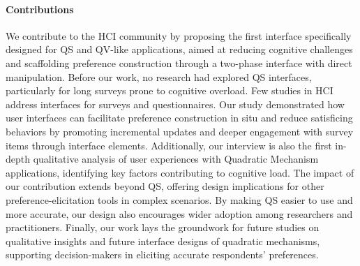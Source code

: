 \paragraph{Contributions}
We contribute to the HCI community by proposing the first interface specifically designed for QS and QV-like applications, aimed at reducing cognitive challenges and scaffolding preference construction through a two-phase interface with direct manipulation. Before our work, no research had explored QS interfaces, particularly for long surveys prone to cognitive overload. Few studies in HCI address interfaces for surveys and questionnaires. Our study demonstrated how user interfaces can facilitate preference construction in situ and reduce satisficing behaviors by promoting incremental updates and deeper engagement with survey items through interface elements. Additionally, our interview is also the first in-depth qualitative analysis of user experiences with Quadratic Mechanism applications, identifying key factors contributing to cognitive load. The impact of our contribution extends beyond QS, offering design implications for other preference-elicitation tools in complex scenarios. By making QS easier to use and more accurate, our design also encourages wider adoption among researchers and practitioners. Finally, our work lays the groundwork for future studies on qualitative insights and future interface designs of quadratic mechanisms, supporting decision-makers in eliciting accurate respondents' preferences.


